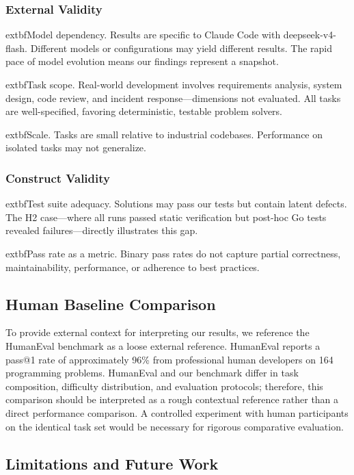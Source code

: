 \documentclass[conference]{IEEEtran}
\begin{document}
\subsubsection{External Validity}

			extbf{Model dependency.} Results are specific to Claude Code with deepseek-v4-flash. Different models or configurations may yield different results. The rapid pace of model evolution means our findings represent a snapshot.

			extbf{Task scope.} Real-world development involves requirements analysis, system design, code review, and incident response---dimensions not evaluated. All tasks are well-specified, favoring deterministic, testable problem solvers.

			extbf{Scale.} Tasks are small relative to industrial codebases. Performance on isolated tasks may not generalize.

\subsubsection{Construct Validity}

			extbf{Test suite adequacy.} Solutions may pass our tests but contain latent defects. The H2 case---where all runs passed static verification but post-hoc Go tests revealed failures---directly illustrates this gap.

			extbf{Pass rate as a metric.} Binary pass rates do not capture partial correctness, maintainability, performance, or adherence to best practices.

\subsection{Human Baseline Comparison}
\label{sec:human_baseline}

To provide external context for interpreting our results, we reference the HumanEval benchmark \cite{chen2021evaluating} as a loose external reference. HumanEval reports a pass@1 rate of approximately 96\% from professional human developers on 164 programming problems. HumanEval and our benchmark differ in task composition, difficulty distribution, and evaluation protocols; therefore, this comparison should be interpreted as a rough contextual reference rather than a direct performance comparison. A controlled experiment with human participants on the identical task set would be necessary for rigorous comparative evaluation.

\subsection{Limitations and Future Work}
\end{document}
